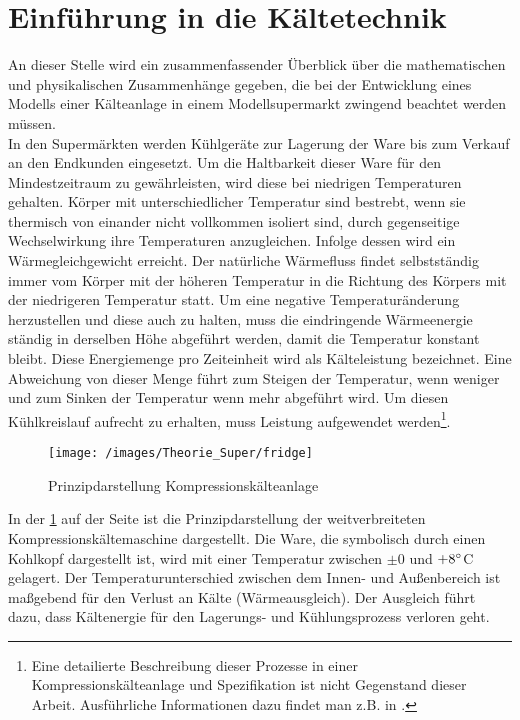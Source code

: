 
\section{Einf\"uhrung in die K\"altetechnik}
\label{technik}
An dieser Stelle wird ein zusammenfassender \"Uberblick über die mathematischen
und physikalischen Zusammenhänge gegeben, die bei der Entwicklung eines Modells
einer K\"alteanlage in einem Modellsupermarkt zwingend beachtet werden müssen.\\

In den Superm\"arkten werden K\"uhlger\"ate zur Lagerung der Ware bis zum
Verkauf an den Endkunden eingesetzt. Um die Haltbarkeit dieser Ware f\"ur den
Mindestzeitraum zu gew\"ahrleisten, wird diese bei niedrigen Temperaturen
gehalten. Körper mit unterschiedlicher Temperatur sind bestrebt, wenn sie
thermisch von einander nicht vollkommen isoliert sind, durch gegenseitige
Wechselwirkung ihre Temperaturen anzugleichen. Infolge dessen wird ein
Wärmegleichgewicht erreicht. Der nat\"urliche W\"armefluss findet
selbstst\"andig immer vom K\"orper mit der h\"oheren Temperatur in die Richtung
des K\"orpers mit der niedrigeren Temperatur statt. Um eine negative
Temperaturänderung herzustellen und diese auch zu halten, muss die eindringende
Wärmeenergie ständig in derselben Höhe abgeführt werden, damit die Temperatur
konstant bleibt. Diese Energiemenge pro Zeiteinheit wird als Kälteleistung
bezeichnet. Eine Abweichung von dieser Menge führt zum Steigen der Temperatur,
wenn weniger und zum Sinken der Temperatur wenn mehr abgeführt wird. Um diesen
Kühlkreislauf aufrecht zu erhalten, muss Leistung aufgewendet werden\footnote{
	Eine detailierte Beschreibung dieser Prozesse in einer
	Kompressionskälteanlage und Spezifikation ist nicht Gegenstand dieser
	Arbeit.  Ausführliche Informationen dazu findet man z.B.  in \cite{caro,
	doctor, TAB_A1}.}.

\begin{figure}[h]
\begin{center}
\texttt{[image: /images/Theorie\_Super/fridge]}
\end{center}
\caption{Prinzipdarstellung Kompressionsk\"alteanlage}
\label{fig:prinz}
\end{figure}

In der \cref{fig:prinz} auf der Seite \pageref{fig:prinz} ist die
Prinzipdarstellung der weitverbreiteten Kompressionsk\"altemaschine dargestellt.
Die Ware, die symbolisch durch einen Kohlkopf dargestellt ist, wird mit einer
Temperatur zwischen $\pm 0$ und $+8^\circ$C gelagert. Der Temperaturunterschied
zwischen dem Innen- und Au\ss enbereich ist ma\ss gebend f\"ur den Verlust an
K\"alte (W\"armeausgleich).  Der Ausgleich f\"uhrt dazu, dass K\"altenergie
f\"ur den Lagerungs- und K\"uhlungsprozess verloren geht.

